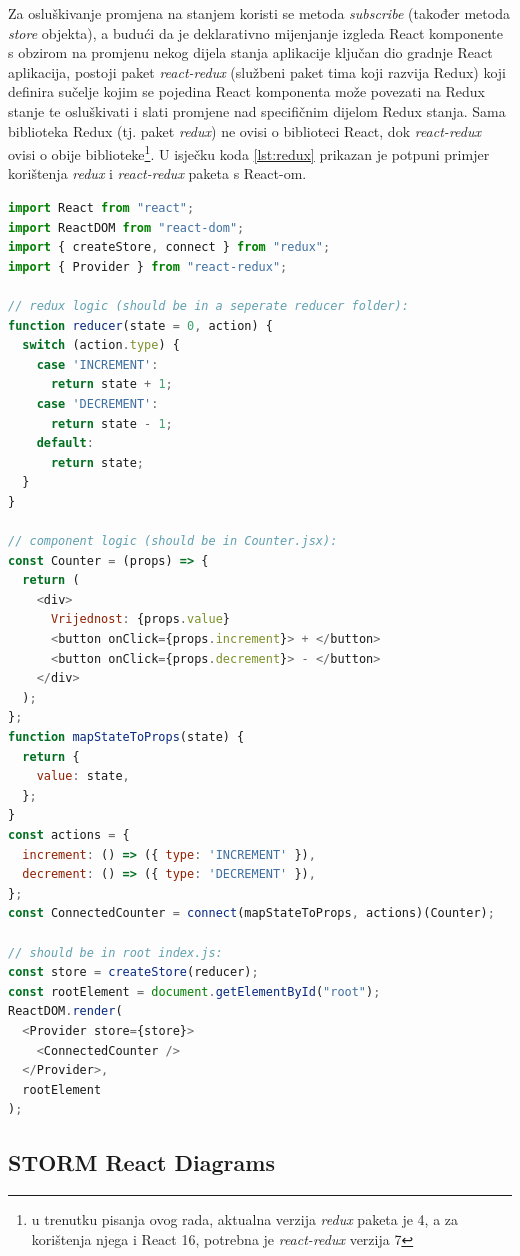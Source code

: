 \documentclass[times, utf8, diplomski, numeric]{fer}
\newcommand{\razmakp}{\vspace{18pt}}
\newcommand{\razmaks}{\vspace{10pt}}
\begin{document}
Za osluškivanje promjena na stanjem koristi se metoda \emph{subscribe} (također metoda \emph{store} objekta), a budući da je deklarativno mijenjanje izgleda React komponente s obzirom na promjenu nekog dijela stanja aplikacije ključan dio gradnje React aplikacija, postoji paket \emph{react-redux} (službeni paket tima koji razvija Redux) koji definira sučelje kojim se pojedina React komponenta može povezati  na Redux stanje te osluškivati i slati promjene nad specifičnim dijelom Redux stanja.
Sama biblioteka Redux (tj. paket \emph{redux}) ne ovisi o biblioteci React, dok \emph{react-redux} ovisi o obije biblioteke\footnote{
    u trenutku pisanja ovog rada, aktualna verzija \emph{redux} paketa je 4, a za korištenja njega i React 16, potrebna je \emph{react-redux} verzija 7
}.
U isječku koda \ref{lst:redux} prikazan je potpuni primjer korištenja \emph{redux} i \emph{react-redux} paketa s React-om.

\razmakp %
\begin{lstlisting}[language=JavaScript, caption={Primjer korištenja Redux biblioteke u React aplikaciji}, label={lst:redux}]
import React from "react";
import ReactDOM from "react-dom";
import { createStore, connect } from "redux";
import { Provider } from "react-redux";

// redux logic (should be in a seperate reducer folder):
function reducer(state = 0, action) {
  switch (action.type) {
    case 'INCREMENT':
      return state + 1;
    case 'DECREMENT':
      return state - 1;
    default:
      return state;
  }
}

// component logic (should be in Counter.jsx):
const Counter = (props) => {
  return (
    <div>
      Vrijednost: {props.value}
      <button onClick={props.increment}> + </button>
      <button onClick={props.decrement}> - </button>
    </div>
  );
};
function mapStateToProps(state) {
  return {
    value: state,
  };
}
const actions = {
  increment: () => ({ type: 'INCREMENT' }),
  decrement: () => ({ type: 'DECREMENT' }),
};
const ConnectedCounter = connect(mapStateToProps, actions)(Counter);

// should be in root index.js:
const store = createStore(reducer);
const rootElement = document.getElementById("root");
ReactDOM.render(
  <Provider store={store}>
    <ConnectedCounter />
  </Provider>,
  rootElement
);
\end{lstlisting}
\razmaks


\newpage
\subsection{STORM React Diagrams} \label{sec:storm}
\end{document}
